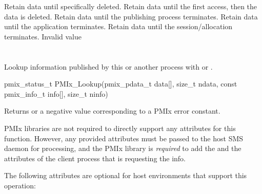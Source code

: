 \begin{constantdesc}
%
Retain data until specifically deleted.
%
Retain data until the first access, then the data is deleted.
%
Retain data until the publishing process terminates.
%
Retain data until the application terminates.
%
Retain data until the session/allocation terminates.
%
Invalid value
%
\end{constantdesc}

\section{}

\summary

Lookup information published by this or another process with  or .

\format

\cspecificstart
\begin{codepar}
pmix_status_t
PMIx_Lookup(pmix_pdata_t data[], size_t ndata,
            const pmix_info_t info[], size_t ninfo)
\end{codepar}
\cspecificend

\begin{arglist}
\end{arglist}

Returns  or a negative value corresponding to a PMIx error constant.

\reqattrstart
\ac{PMIx} libraries are not required to directly support any attributes for this function. However, any provided attributes must be passed to the host \ac{SMS} daemon for processing, and the \ac{PMIx} library is \textit{required} to add the  and the  attributes of the client process that is requesting the info.

\reqattrend

\optattrstart
The following attributes are optional for host environments that support this operation:

